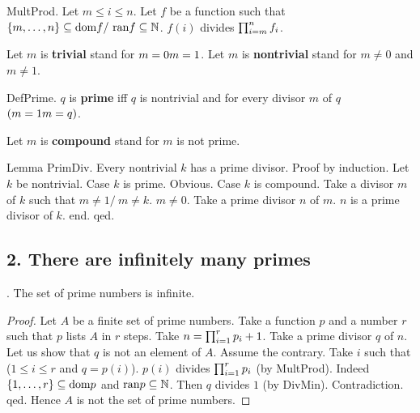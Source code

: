 
Let $m$ is {\bf compound} stand for $m$ is not prime.

Lemma PrimDiv.
Every nontrivial $k$ has a prime divisor.
Proof by induction.
Let $k$ be nontrivial.
Case $k$ is prime. Obvious.
Case $k$ is compound. 
Take a divisor $m$ of $k$ such that $m \neq 1 /\ m \neq k$.
$m \neq 0$.
Take a prime divisor $n$ of $m$.
$n$ is a prime divisor of $k$.
end.
qed.

\subsection{2. There are infinitely many primes}

\begin{theorem}.
The set of prime numbers is infinite.
\end{theorem}
\begin{proof}
Let $A$ be a finite set of prime numbers.
Take a function $p$ and a number $r$ such that 
$p$ lists $A$ in $r$ steps.
Take $n=\Product{p}{1}{r}+1$.
Take a prime divisor $q$ of $n$.
Let us show that $q$ is not an element of $A$.
Assume the contrary.
Take $i$ such that ($1 \leq i \leq r$ and $q=p(i)$).
$p(i)$ divides $\Product{p}{1}{r}$ (by MultProd).
Indeed $\Seq{1}{r} \subseteq \text{dom} p$ and 
$\text{ran} p \subseteq \NN$.
Then $q$ divides $1$ (by DivMin). 
Contradiction. qed.
Hence $A$ is not the set of prime numbers.
\end{proof}




